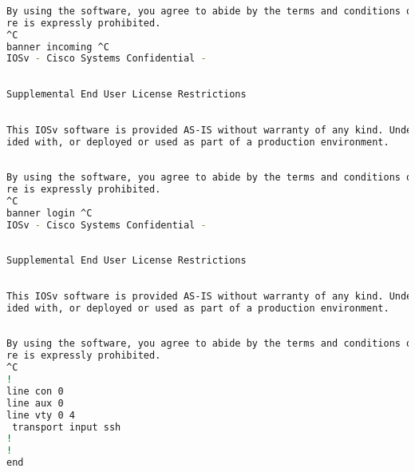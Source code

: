 \begin{lstlisting}[language=bash]
          
By using the software, you agree to abide by the terms and conditions of the Cisco End User License Agreement at http://www.cisco.com/go/eula. Unauthorized use or distribution of this softwa
re is expressly prohibited.
^C        
banner incoming ^C
IOSv - Cisco Systems Confidential -
          
          
Supplemental End User License Restrictions
          
          
This IOSv software is provided AS-IS without warranty of any kind. Under no circumstances may this software be used separate from the Cisco Modeling Labs Software that this software was prov
ided with, or deployed or used as part of a production environment.
          
          
By using the software, you agree to abide by the terms and conditions of the Cisco End User License Agreement at http://www.cisco.com/go/eula. Unauthorized use or distribution of this softwa
re is expressly prohibited.
^C        
banner login ^C
IOSv - Cisco Systems Confidential -
          
          
Supplemental End User License Restrictions
          
          
This IOSv software is provided AS-IS without warranty of any kind. Under no circumstances may this software be used separate from the Cisco Modeling Labs Software that this software was prov
ided with, or deployed or used as part of a production environment.
          
          
By using the software, you agree to abide by the terms and conditions of the Cisco End User License Agreement at http://www.cisco.com/go/eula. Unauthorized use or distribution of this softwa
re is expressly prohibited.
^C        
!         
line con 0
line aux 0
line vty 0 4
 transport input ssh
!         
!         
end       
\end{lstlisting}

\pagebreak